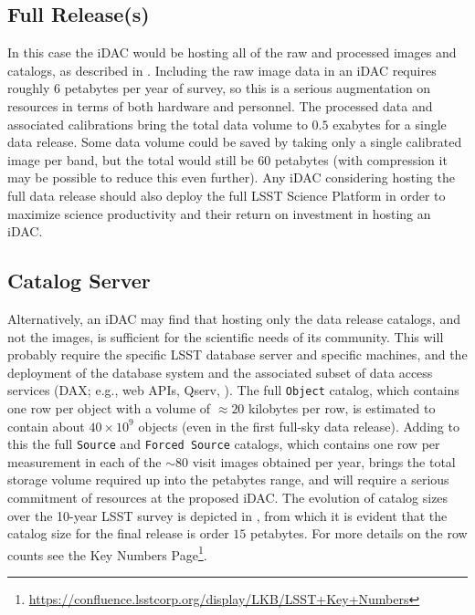 \subsection{Full Release(s)}

In this case the iDAC would be hosting all of the raw and processed images and catalogs, as described in . Including the raw image data in an iDAC requires roughly $6$ petabytes per year of survey, so this is a serious augmentation on resources in terms of both hardware and personnel. The processed data and associated calibrations bring the total data volume to $0.5$ exabytes for a single data release. Some data volume could be saved by taking only a single calibrated image per band, but the total would still be $60$ petabytes (with compression it may be possible to reduce this even further). Any iDAC considering hosting the full data release should also deploy the full LSST Science Platform  in order to maximize science productivity and their return on investment in hosting an iDAC.

\subsection{Catalog Server}

Alternatively, an iDAC may find that hosting only the data release catalogs, and not the images, is sufficient for the scientific needs of its community. This will probably require the specific LSST database server  and specific machines, and the deployment of the database system and the associated subset of data access services (DAX; e.g., web APIs, Qserv, ). The full {\tt Object} catalog, which contains one row per object with a volume of $\approx 20$ kilobytes per row, is estimated to contain about $40 \times 10^9$ objects (even in the first full-sky data release). Adding to this the full {\tt Source} and {\tt Forced Source} catalogs, which contains one row per measurement in each of the $\sim80$ visit images obtained per year, brings the total storage volume required up into the petabytes range, and will require a serious commitment of resources at the proposed iDAC. The evolution of catalog sizes over the 10-year LSST survey is depicted in , from which it is evident that the catalog size for the final release is order $15$ petabytes. For more details on the row counts see the Key Numbers Page\footnote{\url{https://confluence.lsstcorp.org/display/LKB/LSST+Key+Numbers}}.

